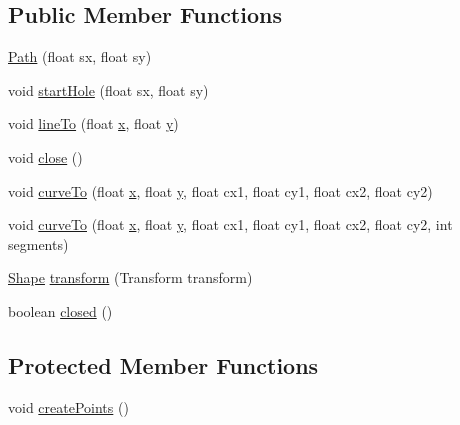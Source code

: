 \subsection*{Public Member Functions}
\begin{DoxyCompactItemize}
\item 
\mbox{\hyperlink{classorg_1_1newdawn_1_1slick_1_1geom_1_1_path_a5fef0f2e57590f14cccad52e87d5c0bb}{Path}} (float sx, float sy)
\item 
void \mbox{\hyperlink{classorg_1_1newdawn_1_1slick_1_1geom_1_1_path_a0f2db2e3edd88b4deb26c107473bb8ea}{start\+Hole}} (float sx, float sy)
\item 
void \mbox{\hyperlink{classorg_1_1newdawn_1_1slick_1_1geom_1_1_path_a5ccd0274fe2b8aa3db05ddd777ff2bce}{line\+To}} (float \mbox{\hyperlink{classorg_1_1newdawn_1_1slick_1_1geom_1_1_shape_a3e985bfff386c15a4efaad03d8ad60d3}{x}}, float \mbox{\hyperlink{classorg_1_1newdawn_1_1slick_1_1geom_1_1_shape_a9f934baded6a1b65ebb69e7e5f80ea00}{y}})
\item 
void \mbox{\hyperlink{classorg_1_1newdawn_1_1slick_1_1geom_1_1_path_aa4171633209585dddcf46195c30e9bc9}{close}} ()
\item 
void \mbox{\hyperlink{classorg_1_1newdawn_1_1slick_1_1geom_1_1_path_aa7ba55ecbfb56e6cfd2158086d362051}{curve\+To}} (float \mbox{\hyperlink{classorg_1_1newdawn_1_1slick_1_1geom_1_1_shape_a3e985bfff386c15a4efaad03d8ad60d3}{x}}, float \mbox{\hyperlink{classorg_1_1newdawn_1_1slick_1_1geom_1_1_shape_a9f934baded6a1b65ebb69e7e5f80ea00}{y}}, float cx1, float cy1, float cx2, float cy2)
\item 
void \mbox{\hyperlink{classorg_1_1newdawn_1_1slick_1_1geom_1_1_path_a680f7d8723465657fc576c0fa123e02a}{curve\+To}} (float \mbox{\hyperlink{classorg_1_1newdawn_1_1slick_1_1geom_1_1_shape_a3e985bfff386c15a4efaad03d8ad60d3}{x}}, float \mbox{\hyperlink{classorg_1_1newdawn_1_1slick_1_1geom_1_1_shape_a9f934baded6a1b65ebb69e7e5f80ea00}{y}}, float cx1, float cy1, float cx2, float cy2, int segments)
\item 
\mbox{\hyperlink{classorg_1_1newdawn_1_1slick_1_1geom_1_1_shape}{Shape}} \mbox{\hyperlink{classorg_1_1newdawn_1_1slick_1_1geom_1_1_path_a17055610942f82343760c043ace084df}{transform}} (Transform transform)
\item 
boolean \mbox{\hyperlink{classorg_1_1newdawn_1_1slick_1_1geom_1_1_path_a237262eda546795e1ff49f4d8da5c383}{closed}} ()
\end{DoxyCompactItemize}
\subsection*{Protected Member Functions}
\begin{DoxyCompactItemize}
\item 
void \mbox{\hyperlink{classorg_1_1newdawn_1_1slick_1_1geom_1_1_path_ade98d8658a21b9e18b03977a91ef21ae}{create\+Points}} ()
\end{DoxyCompactItemize}
